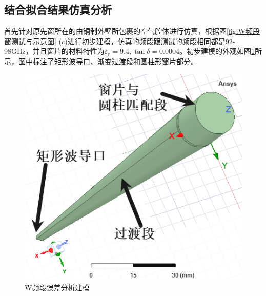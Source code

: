 \documentclass[master]{thesis-uestc}
\begin{document}
\subsection{结合拟合结果仿真分析}
首先针对原先窗所在的由铜制外壁所包裹的空气腔体进行仿真，根据图\ref{fig:W频段窗测试与示意图} (c)进行初步建模，仿真的频段跟测试的频段相同都是92-98GHz，并且窗片的材料特性为\(\varepsilon_r = 9.4, \tan \delta = 0.0004\)。初步建模的外观如图\ref{fig:W波段误差分析建模}所示，图中标注了矩形波导口、渐变过渡段和圆柱形窗片部分。
\begin{figure}[!htb]
    \centering
    \includegraphics[width=0.35\linewidth]{pic/chapter5/W频段误差分析建模.png}
    \caption{W频段误差分析建模}
    \label{fig:W波段误差分析建模}
\end{figure}
\end{document}
